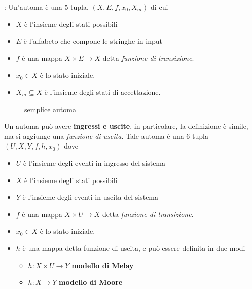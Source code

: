 \documentclass[10pt, letterpaper]{report}
\begin{document}
 : Un'automa è una 
5-tupla, $(X,E,f,x_0, X_m)$ di cui\begin{itemize}
    \item $X$ è l'insieme degli stati possibili 
    \item $E$ è l'alfabeto che compone le stringhe in input 
    \item $f$ è una mappa $X\times E \rightarrow X$ detta 
    \textit{funzione di transizione}. 
    \item $x_0\in X$ è lo stato iniziale. 
    \item $X_m\subseteq X$ è l'insieme degli stati di accettazione.
\end{itemize}
\begin{figure}[h!]
    \centering
        \caption{semplice automa}
        \label{fig:automaSemplice}
\end{figure}
Un automa può avere \textbf{ingressi e uscite}, in particolare, la definizione è simile, ma si aggiunge una \textit{funzione di uscita}. Tale automa è una 6-tupla $(U,X,Y,f,h,x_0)$ dove\begin{itemize}
    \item $U$ è l'insieme degli eventi in ingresso del sistema
    \item $X$ è l'insieme degli stati possibili 
    \item $Y$ è l'insieme degli eventi in uscita  del sistema
    \item $f$ è una mappa $X\times U \rightarrow X$ detta 
    \textit{funzione di transizione}. 
    \item $x_0\in X$ è lo stato iniziale. 
    \item $h$ è una mappa detta funzione di uscita, e può essere definita in due modi \begin{itemize}
        \item $h:X\times U \rightarrow Y$ \textbf{modello di Melay}
        \item $h:X \rightarrow Y$ \textbf{modello di Moore}
    \end{itemize}
\end{itemize}
\end{document}
